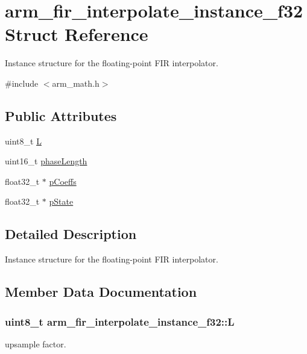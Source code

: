 \hypertarget{structarm__fir__interpolate__instance__f32}{}\section{arm\+\_\+fir\+\_\+interpolate\+\_\+instance\+\_\+f32 Struct Reference}
\label{structarm__fir__interpolate__instance__f32}


Instance structure for the floating-\/point F\+IR interpolator.  




{\ttfamily \#include $<$arm\+\_\+math.\+h$>$}

\subsection*{Public Attributes}
\begin{DoxyCompactItemize}
\item 
uint8\+\_\+t \hyperlink{structarm__fir__interpolate__instance__f32_ae6f94dcc0ccd8aa4bc699b20985d9df5}{L}
\item 
uint16\+\_\+t \hyperlink{structarm__fir__interpolate__instance__f32_a389e669e13ec56292a70db8e92194b12}{phase\+Length}
\item 
float32\+\_\+t $\ast$ \hyperlink{structarm__fir__interpolate__instance__f32_a86053b715980a93c9df630d6de5bb63c}{p\+Coeffs}
\item 
float32\+\_\+t $\ast$ \hyperlink{structarm__fir__interpolate__instance__f32_a42a8ba1bda85fa86d7b6c84d3da4c75b}{p\+State}
\end{DoxyCompactItemize}


\subsection{Detailed Description}
Instance structure for the floating-\/point F\+IR interpolator. 

\subsection{Member Data Documentation}
\subsubsection[{\texorpdfstring{L}{L}}]{\setlength{\rightskip}{0pt plus 5cm}uint8\+\_\+t arm\+\_\+fir\+\_\+interpolate\+\_\+instance\+\_\+f32\+::L}\hypertarget{structarm__fir__interpolate__instance__f32_ae6f94dcc0ccd8aa4bc699b20985d9df5}{}\label{structarm__fir__interpolate__instance__f32_ae6f94dcc0ccd8aa4bc699b20985d9df5}
upsample factor. 
